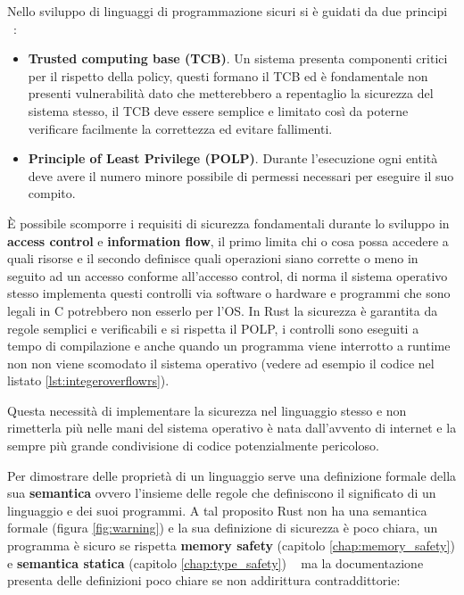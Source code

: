 \documentclass[Lau,binding=0.6cm]{sapthesis}
\begin{document}
Nello sviluppo di linguaggi di programmazione sicuri si è guidati da due principi ~\cite{nino:security_programming_language}:
\begin{itemize}
    \item \textbf{Trusted computing base (TCB)}. Un sistema presenta componenti critici per il rispetto della policy, questi formano il TCB ed è fondamentale non presenti vulnerabilità dato che metterebbero a repentaglio la sicurezza del sistema stesso, il TCB deve essere semplice e limitato così da poterne verificare facilmente la correttezza ed evitare fallimenti. 
    \item \textbf{Principle of Least Privilege (POLP)}. Durante l'esecuzione ogni entità deve avere il numero minore possibile di permessi necessari per eseguire il suo compito. 
\end{itemize} 
È possibile scomporre i requisiti di sicurezza fondamentali durante lo sviluppo in \textbf{access control} e \textbf{information flow}, il primo limita chi o cosa possa accedere a quali risorse e il secondo definisce quali operazioni siano corrette o meno in seguito ad un accesso conforme all'accesso control, di norma il sistema operativo stesso implementa questi controlli via software o hardware e programmi che sono legali in C potrebbero non esserlo per l'OS. 
In Rust la sicurezza è garantita da regole semplici e verificabili e si rispetta il POLP, i controlli sono eseguiti a tempo di compilazione e anche quando un programma viene interrotto a runtime non non viene scomodato il sistema operativo (vedere ad esempio il codice nel listato \ref{lst:integeroverflowrs}).

Questa necessità di implementare la sicurezza nel linguaggio stesso e non rimetterla più nelle mani del sistema operativo è nata dall'avvento di internet e la sempre più grande condivisione di codice potenzialmente pericoloso.

Per dimostrare delle proprietà di un linguaggio serve una definizione formale della sua \textbf{semantica} ovvero l'insieme delle regole che definiscono il significato di un linguaggio e dei suoi programmi.
A tal proposito Rust non ha una semantica formale (figura \ref{fig:warning}) e la sua definizione di sicurezza è poco chiara, un programma è sicuro se rispetta \textbf{memory safety} (capitolo \ref{chap:memory_safety}) e \textbf{semantica statica} (capitolo \ref{chap:type_safety}) ~\cite[14]{rust:reference} ma la documentazione presenta delle definizioni poco chiare se non addirittura contraddittorie: 
\end{document}
